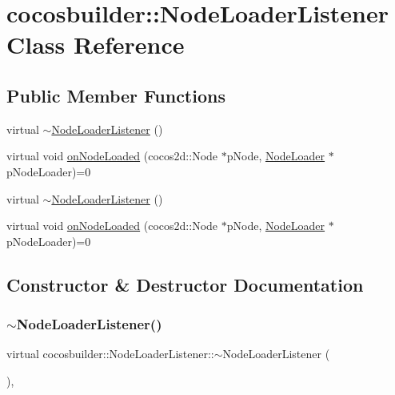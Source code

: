 \hypertarget{classcocosbuilder_1_1NodeLoaderListener}{}\section{cocosbuilder\+:\+:Node\+Loader\+Listener Class Reference}
\label{classcocosbuilder_1_1NodeLoaderListener}
\subsection*{Public Member Functions}
\begin{DoxyCompactItemize}
\item 
virtual \hyperlink{classcocosbuilder_1_1NodeLoaderListener_a44c1c88975d61aaa8fff44807a7ce3ec}{$\sim$\+Node\+Loader\+Listener} ()
\item 
virtual void \hyperlink{classcocosbuilder_1_1NodeLoaderListener_ac65f2d3a70f58da3df7be621e2b6f316}{on\+Node\+Loaded} (cocos2d\+::\+Node $\ast$p\+Node, \hyperlink{classcocosbuilder_1_1NodeLoader}{Node\+Loader} $\ast$p\+Node\+Loader)=0
\item 
virtual \hyperlink{classcocosbuilder_1_1NodeLoaderListener_a44c1c88975d61aaa8fff44807a7ce3ec}{$\sim$\+Node\+Loader\+Listener} ()
\item 
virtual void \hyperlink{classcocosbuilder_1_1NodeLoaderListener_ac65f2d3a70f58da3df7be621e2b6f316}{on\+Node\+Loaded} (cocos2d\+::\+Node $\ast$p\+Node, \hyperlink{classcocosbuilder_1_1NodeLoader}{Node\+Loader} $\ast$p\+Node\+Loader)=0
\end{DoxyCompactItemize}


\subsection{Constructor \& Destructor Documentation}
\mbox{\label{classcocosbuilder_1_1NodeLoaderListener_a44c1c88975d61aaa8fff44807a7ce3ec}} 
\subsubsection{\texorpdfstring{$\sim$\+Node\+Loader\+Listener()}{~NodeLoaderListener()}\hspace{0.1cm}{\footnotesize\ttfamily [1/2]}}
{\footnotesize\ttfamily virtual cocosbuilder\+::\+Node\+Loader\+Listener\+::$\sim$\+Node\+Loader\+Listener (\begin{DoxyParamCaption}{ }\end{DoxyParamCaption})\hspace{0.3cm}{\ttfamily [inline]}, {\ttfamily [virtual]}}

